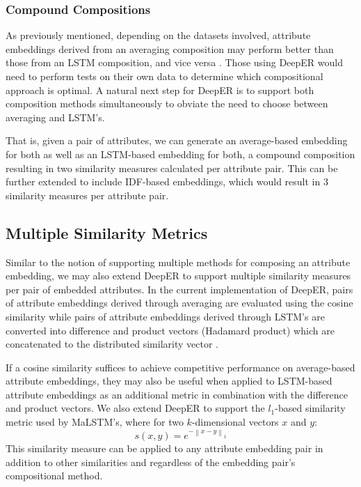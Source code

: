 \documentclass{proc}
\begin{document}
\subsubsection{Compound Compositions}

As previously mentioned, depending on the datasets involved, attribute embeddings derived from an averaging composition may perform better than those from an LSTM composition, and vice versa \cite{ebraheem-deep-er}. Those using DeepER would need to perform tests on their own data to determine which compositional approach is optimal. A natural next step for DeepER is to support both composition methods simultaneously to obviate the need to choose between averaging and LSTM's.

That is, given a pair of attributes, we can generate an average-based embedding for both as well as an LSTM-based embedding for both, a compound composition resulting in two similarity measures calculated per attribute pair. This can be further extended to include IDF-based embeddings, which would result in 3 similarity measures per attribute pair.

\subsection{Multiple Similarity Metrics}

Similar to the notion of supporting multiple methods for composing an attribute embedding, we may also extend DeepER to support multiple similarity measures per pair of embedded attributes. In the current implementation of DeepER, pairs of attribute embeddings derived through averaging are evaluated using the cosine similarity while pairs of attribute embeddings derived through LSTM's are converted into difference and product vectors (Hadamard product) which are concatenated to the distributed similarity vector \cite{ebraheem-deep-er}.

If a cosine similarity suffices to achieve competitive performance on average-based attribute embeddings, they may also be useful when applied to LSTM-based attribute embeddings as an additional metric in combination with the difference and product vectors. We also extend DeepER to support the $l_1$-based similarity metric used by MaLSTM's, where for two $k$-dimensional vectors $x$ and $y$: $$s(x, y) = e^{-\left\|x - y\right\|_1}$$ This similarity measure can be applied to any attribute embedding pair in addition to other similarities and regardless of the embedding pair's compositional method.
\end{document}
